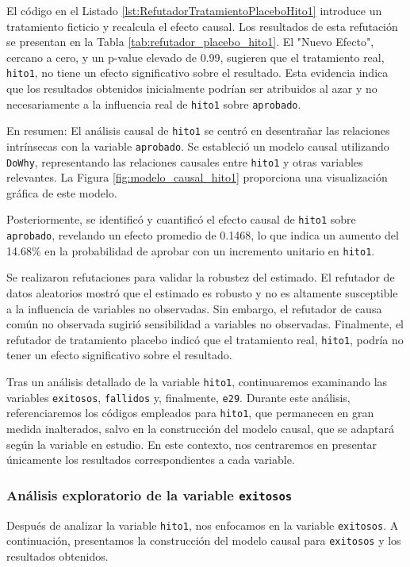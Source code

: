El código en el Listado \ref{lst:RefutadorTratamientoPlaceboHito1} introduce un tratamiento ficticio y recalcula el efecto causal. Los resultados de esta refutación se presentan en la Tabla \ref{tab:refutador_placebo_hito1}. El "Nuevo Efecto", cercano a cero, y un p-value elevado de 0.99, sugieren que el tratamiento real, \texttt{hito1}, no tiene un efecto significativo sobre el resultado. Esta evidencia indica que los resultados obtenidos inicialmente podrían ser atribuidos al azar y no necesariamente a la influencia real de \texttt{hito1} sobre \texttt{aprobado}.

En resumen: El análisis causal de \texttt{hito1} se centró en desentrañar las relaciones intrínsecas con la variable \texttt{aprobado}. Se estableció un modelo causal utilizando \texttt{DoWhy}, representando las relaciones causales entre \texttt{hito1} y otras variables relevantes. La Figura \ref{fig:modelo_causal_hito1} proporciona una visualización gráfica de este modelo.

Posteriormente, se identificó y cuantificó el efecto causal de \texttt{hito1} sobre \texttt{aprobado}, revelando un efecto promedio de 0.1468, lo que indica un aumento del 14.68\% en la probabilidad de aprobar con un incremento unitario en \texttt{hito1}.

Se realizaron refutaciones para validar la robustez del estimado. El refutador de datos aleatorios mostró que el estimado es robusto y no es altamente susceptible a la influencia de variables no observadas. Sin embargo, el refutador de causa común no observada sugirió sensibilidad a variables no observadas. Finalmente, el refutador de tratamiento placebo indicó que el tratamiento real, \texttt{hito1}, podría no tener un efecto significativo sobre el resultado.

Tras un análisis detallado de la variable \texttt{hito1}, continuaremos examinando las variables \texttt{exitosos}, \texttt{fallidos} y, finalmente, \texttt{e29}. Durante este análisis, referenciaremos los códigos empleados para \texttt{hito1}, que permanecen en gran medida inalterados, salvo en la construcción del modelo causal, que se adaptará según la variable en estudio. En este contexto, nos centraremos en presentar únicamente los resultados correspondientes a cada variable.


\subsubsection{Análisis exploratorio de la variable \texttt{exitosos}}
Después de analizar la variable \texttt{hito1}, nos enfocamos en la variable \texttt{exitosos}. A continuación, presentamos la construcción del modelo causal para \texttt{exitosos} y los resultados obtenidos.

